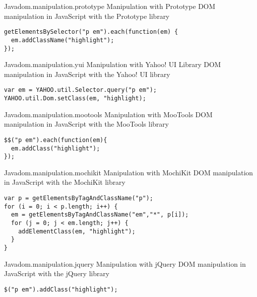 \begin{scode}{Java}{dom.manipulation.prototype}{%
   Manipulation with Prototype}{%
  DOM manipulation in JavaScript with the Prototype library}
\begin{lstlisting}
getElementsBySelector("p em").each(function(em) {
  em.addClassName("highlight");
});
\end{lstlisting}
\end{scode}

\begin{scode}{Java}{dom.manipulation.yui}{%
   Manipulation with Yahoo! UI Library}{%
  DOM manipulation in JavaScript with the Yahoo! UI library}
\begin{lstlisting}
var em = YAHOO.util.Selector.query("p em"); 
YAHOO.util.Dom.setClass(em, "highlight);
\end{lstlisting}
\end{scode}

\begin{scode}{Java}{dom.manipulation.mootools}{%
   Manipulation with MooTools}{%
  DOM manipulation in JavaScript with the MooTools library}
\begin{lstlisting}
$$("p em").each(function(em){
  em.addClass("highlight");
});
\end{lstlisting}
\end{scode}

\begin{scode}{Java}{dom.manipulation.mochikit}{%
   Manipulation with MochiKit}{%
  DOM manipulation in JavaScript with the MochiKit library}
\begin{lstlisting}
var p = getElementsByTagAndClassName("p");
for (i = 0; i < p.length; i++) {
  em = getElementsByTagAndClassName("em","*", p[i]);
  for (j = 0; j < em.length; j++) {
    addElementClass(em, "highlight");
  }
}
\end{lstlisting}
\end{scode}

\begin{scode}{Java}{dom.manipulation.jquery}{%
   Manipulation with jQuery}{%
  DOM manipulation in JavaScript with the jQuery library}
\begin{lstlisting}
$("p em").addClass("highlight");
\end{lstlisting}
\end{scode}

